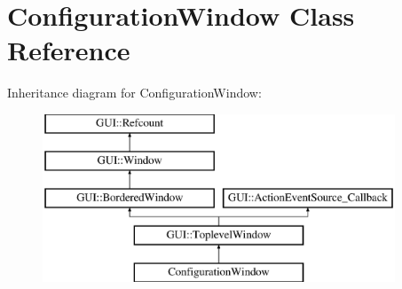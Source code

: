 \hypertarget{classConfigurationWindow}{\section{Configuration\-Window Class Reference}
\label{classConfigurationWindow}
}
Inheritance diagram for Configuration\-Window\-:\begin{figure}[H]
\begin{center}
\leavevmode
\includegraphics[height=5.000000cm]{classConfigurationWindow}
\end{center}
\end{figure}
